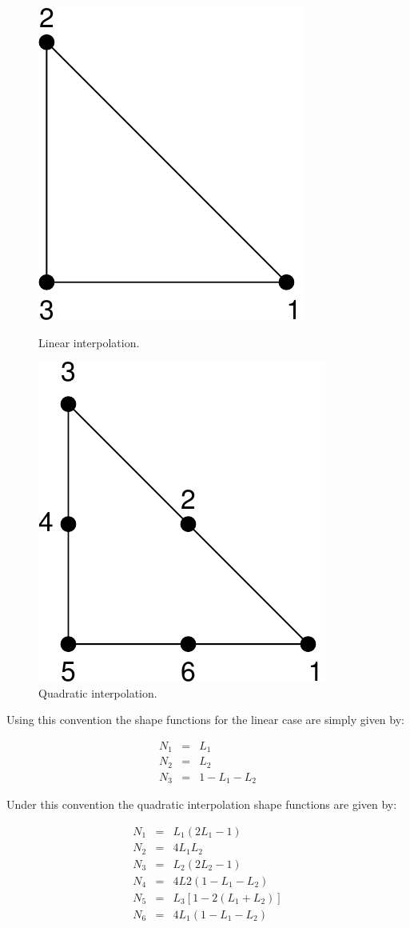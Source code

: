 \documentclass[12pt]{article}
\begin{document}
\begin{figure}[!hbt]
\begin{minipage}[b]{0.5\linewidth}
\centering
\includegraphics[width = 0.4\linewidth]{tria3.pdf}
\caption{Linear interpolation.}
\end{minipage}
\hspace{0.5cm}
\begin{minipage}[b]{0.5\linewidth}
\centering
\includegraphics[width = 0.4\linewidth]{tria6.pdf}
\caption{Quadratic interpolation.}
\end{minipage}
\end{figure}

Using this convention the shape functions for the linear case are simply given by:

\begin{eqnarray}
N_1 & = & L_1 \\
N_2 & = & L_2 \\
N_3 & = & 1-L_1-L_2
\end{eqnarray}

Under this convention the quadratic interpolation shape functions are given by:

\begin{eqnarray}
N_1 & = & L_1(2L_1-1) \\
N_2 & = & 4L_1L_2 \\
N_3 & = & L_2(2L_2-1) \\
N_4 & = & 4L2(1-L_1-L_2) \\
N_5 & = & L_3[1-2(L_1+L_2)] \\
N_6 & = & 4L_1(1-L_1-L_2)
\end{eqnarray}
\end{document}
